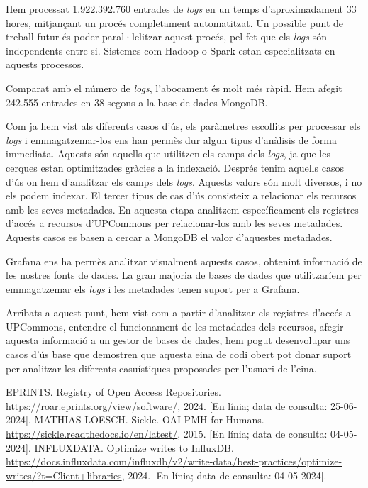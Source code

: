\documentclass[lettersize,journal]{IEEEtran}
\begin{document}
Hem processat 1.922.392.760 entrades de \textit{logs} en un temps d'aproximadament 33 hores, mitjançant un procés completament automatitzat.
Un possible punt de treball futur és poder paral·lelitzar aquest procés, pel fet que els \textit{logs} són independents entre si.
Sistemes com Hadoop o Spark estan especialitzats en aquests processos.

Comparat amb el número de \textit{logs}, l'abocament és molt més ràpid.
Hem afegit 242.555 entrades en 38 segons a la base de dades MongoDB.

Com ja hem vist als diferents casos d'ús, els paràmetres escollits per processar els \textit{logs} i emmagatzemar-los ens han permès dur algun tipus d'anàlisis de forma immediata.
Aquests són aquells que utilitzen els camps dels \textit{logs}, ja que les cerques estan optimitzades gràcies a la indexació.
Després tenim aquells casos d'ús on hem d'analitzar els camps dels \textit{logs}.
Aquests valors són molt diversos, i no els podem indexar.
El tercer tipus de cas d'ús consisteix a relacionar els recursos amb les seves metadades.
En aquesta etapa analitzem específicament els registres d'accés a recursos d'UPCommons per relacionar-los amb les seves metadades.
Aquests casos es basen a cercar a MongoDB el valor d'aquestes metadades.

Grafana ens ha permès analitzar visualment aquests casos, obtenint informació de les nostres fonts de dades.
La gran majoria de bases de dades que utilitzaríem per emmagatzemar els \textit{logs} i les metadades tenen suport per a Grafana.

Arribats a aquest punt, hem vist com a partir d'analitzar els registres d'accés a UPCommons, entendre el funcionament de les metadades dels recursos, afegir aquesta informació a un gestor de bases de dades, hem pogut desenvolupar uns casos d'ús base que demostren que aquesta eina de codi obert pot donar suport per analitzar les diferents casuístiques proposades per l'usuari de l'eina.

\begin{thebibliography}{1}

    EPRINTS. Registry of Open Access Repositories. \url{https://roar.eprints.org/view/software/}, 2024. [En línia; data de consulta: 25-06-2024].
    MATHIAS LOESCH. Sickle. OAI-PMH for Humans. \url{https://sickle.readthedocs.io/en/latest/}, 2015. [En línia; data de consulta: 04-05-2024].
    INFLUXDATA. Optimize writes to InfluxDB. \url{https://docs.influxdata.com/influxdb/v2/write-data/best-practices/optimize-writes/?t=Client+libraries}, 2024. [En línia; data de consulta: 04-05-2024].
\end{thebibliography}
\end{document}
